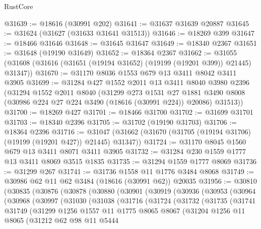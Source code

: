 \begin{lexlean}{RustCore}
\begin{coremodule}
@31639 := @18616 (@30991 @202)
@31641 := @31637 @31639 @20887
@31645 := @31624 (@31627 (@31633 @31641 @31513))
@31646 := @18269 @399
@31647 := @18466 @31646
@31648 := @31645 @31647
@31649 := @18340 @2367
@31651 := @31648 (@19190 @31649)
@31652 := @18364 @2367
@31662 := @31055 (@31608 (@31616 (@31651 (@19194 @31652) (@19199 (@19201 @399)) @21445) @31347))
@31670 := @31170 @8036 @1553 @679 @13 @3411 @8042 @3411 @3905
@31699 := @31284
    @427
    @1552
    @2011
    @13
    @3411
    @8040
    @3980
    @2396
    (@31294
      @1552
      @2011
      @8040
      (@31299
        @273
        @1531
        @27
        @1881
        @3490
        @8008
        (@30986 @224 @27 @224 @3490 (@18616 (@30991 @224)) @20086)
        @31513))
@31700 := @18269 @427
@31701 := @18466 @31700
@31702 := @31699 @31701
@31703 := @18340 @2396
@31705 := @31702 (@19190 @31703)
@31706 := @18364 @2396
@31716 := @31047 (@31662 (@31670 (@31705 (@19194 @31706) (@19199 (@19201 @427)) @21445) @31347))
@31724 := @31170 @8045 @1560 @679 @13 @3411 @8071 @3411 @3905
@31732 := @31284 @230 @1559 @1777 @13 @3411 @8069 @3515 @1835
@31735 := @31294 @1559 @1777 @8069
@31736 := @31299 @267
@31741 := @31736 @1558 @11 @1776 @3484 @8068
@31749 := @30986 @62 @11 @62 @3484 (@18616 (@30991 @62)) @20035
@31956 := @30810
    (@30835
      (@30876
        (@30878
          (@30880
            (@30901
              (@30919
                (@30936
                  (@30953
                    (@30964
                      (@30968
                        (@30997
                          (@31030
                            (@31038
                              (@31716
                                (@31724
                                  (@31732
                                    (@31735
                                      (@31741
                                        @31749
                                        (@31299
                                          @1256
                                          @1557
                                          @11
                                          @1775
                                          @8065
                                          @8067
                                          (@31204
                                            @1256
                                            @11
                                            @8065
                                            (@31212
                                              @62
                                              @98
                                              @11
                                              @5444

\end{coremodule}
\end{lexlean}
